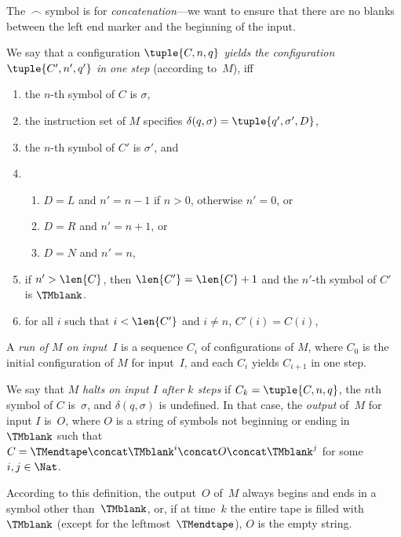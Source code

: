 \documentclass[../../../include/open-logic-section]{subfiles}
\begin{document}
\begin{explain}
The~$\frown$ symbol is for \emph{concatenation}---we want to
ensure that there are no blanks between the left end marker and
the beginning of the input.
\end{explain}

\begin{defn}
We say that a configuration $\tuple{C, n, q}$ \emph{yields the
  configuration $\tuple{C', n', q'}$ in one step} (according to~$M$),
  iff
\begin{enumerate}
\item the $n$-th symbol of $C$ is $\sigma$,
\item the instruction set of $M$ specifies $\delta(q, \sigma) =
  \tuple{q', \sigma', D}$,
\item the $n$-th symbol of $C'$ is $\sigma'$, and 
\item
\begin{enumerate}
\item $D = L$ and $n' = n - 1$ if $n>0$, otherwise $n'=0$, or
\item $D = R$ and $n' = n + 1$, or
\item $D = N$ and $n' = n$,
\end{enumerate}
\item if $n' > \len{C}$, then $\len{C'} = \len{C} + 1$ and the $n'$-th
  symbol of $C'$ is $\TMblank$.
\item for all $i$ such that $i < \len{C'}$ and $i \neq n$, $C'(i) = C(i)$,
\end{enumerate}
\end{defn}

\begin{defn}
A \emph{run of $M$ on input~$I$} is a sequence $C_i$ of configurations
of $M$, where $C_0$ is the initial configuration of $M$ for input~$I$,
and each $C_i$ yields $C_{i+1}$ in one step.

We say that $M$ \emph{halts on input $I$ after $k$ steps} if $C_k =
\tuple{C, n, q}$, the $n$th symbol of $C$ is~$\sigma$, and $\delta(q,
\sigma)$ is undefined.  In that case, the \emph{output} of~$M$ for
input $I$ is~$O$, where $O$ is a string of symbols not beginning or
ending in~$\TMblank$ such that $C = \TMendtape \concat \TMblank^i
\concat O \concat \TMblank^j$ for some~$i, j \in \Nat$.
\end{defn}

\begin{explain}
According to this definition, the output~$O$ of~$M$ always begins and
ends in a symbol other than~$\TMblank$, or, if at time~$k$ the entire
tape is filled with~$\TMblank$ (except for the leftmost~$\TMendtape$),
$O$ is the empty string.
\end{explain}
\end{document}
